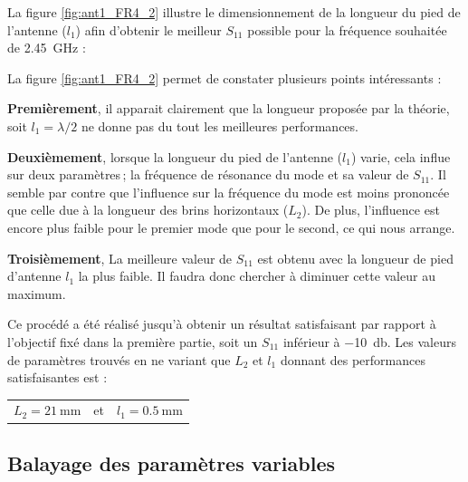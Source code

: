 \documentclass[Deriaz_Traiber_Labo02]{subfiles}
\begin{document}
La figure \ref{fig:ant1_FR4_2} illustre le dimensionnement de la longueur du pied de l'antenne ($l_1$) afin d'obtenir le meilleur $S_{11}$ possible pour la fréquence souhaitée de \SI{2.45}{\giga\hertz} :



\begin{flushleft}
	La figure \ref{fig:ant1_FR4_2} permet de constater plusieurs points intéressants :
\end{flushleft}
\begin{description}
\item \textbf{Premièrement}, il apparait clairement que la longueur proposée par la théorie, soit $l_1=\lambda/2$ ne donne pas du tout les meilleures performances.\\

\item \textbf{Deuxièmement}, lorsque la longueur du pied de l'antenne ($l_1$) varie, cela influe sur deux paramètres ; la fréquence de résonance du mode et sa valeur de $S_{11}$. Il semble par contre que l'influence sur la fréquence du mode est moins prononcée que celle due à la longueur des brins horizontaux ($L_2$). De plus, l'influence est encore plus faible pour le premier mode que pour le second, ce qui nous arrange.\\

\item \textbf{Troisièmement}, La meilleure valeur de $S_{11}$ est obtenu avec la longueur de pied d'antenne $l_1$ la plus faible. Il faudra donc chercher à diminuer cette valeur au maximum.
\end{description}

Ce procédé a été réalisé jusqu'à obtenir un résultat satisfaisant par rapport à l'objectif fixé dans la première partie, soit un $S_{11}$ inférieur à \SI{-10}{\decibel}. Les valeurs de paramètres trouvés en ne variant que $L_2$ et $l_1$ donnant des performances satisfaisantes est :
\begin{table}[H]
\centering
\begin{tabular}{c c c}
$\boxed{L_2 = \SI{21}{\milli\meter}}$ & et &  $\boxed{l_1 = \SI{0.5}{\milli\meter}}$
\end{tabular}
\end{table}

\pagebreak

\subsection{Balayage des paramètres variables}
\end{document}
